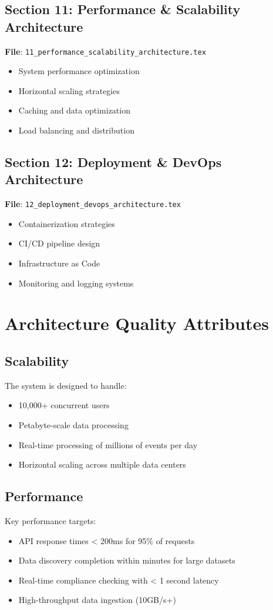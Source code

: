 \documentclass[12pt,a4paper]{article}
\begin{document}
\subsection{Section 11: Performance \& Scalability Architecture}
\textbf{File}: \texttt{11\_performance\_scalability\_architecture.tex}
\begin{itemize}
    \item System performance optimization
    \item Horizontal scaling strategies
    \item Caching and data optimization
    \item Load balancing and distribution
\end{itemize}

\subsection{Section 12: Deployment \& DevOps Architecture}
\textbf{File}: \texttt{12\_deployment\_devops\_architecture.tex}
\begin{itemize}
    \item Containerization strategies
    \item CI/CD pipeline design
    \item Infrastructure as Code
    \item Monitoring and logging systems
\end{itemize}

\section{Architecture Quality Attributes}

\subsection{Scalability}
The system is designed to handle:
\begin{itemize}
    \item 10,000+ concurrent users
    \item Petabyte-scale data processing
    \item Real-time processing of millions of events per day
    \item Horizontal scaling across multiple data centers
\end{itemize}

\subsection{Performance}
Key performance targets:
\begin{itemize}
    \item API response times < 200ms for 95\% of requests
    \item Data discovery completion within minutes for large datasets
    \item Real-time compliance checking with < 1 second latency
    \item High-throughput data ingestion (10GB/s+)
\end{itemize}
\end{document}
